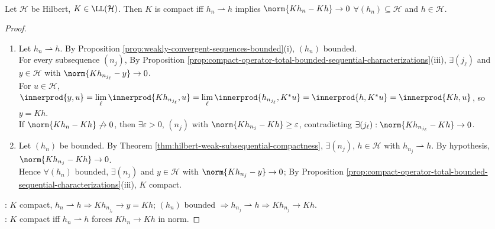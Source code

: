 \begin{theorem} \label{thm:compact-operator-weak-to-strong-characterization} \\
Let $\mathcal{H}$ be Hilbert, $K\in\LL(\mathcal{H})$. Then $K$ is compact iff $h_n\rightharpoonup h$ implies $\norm{Kh_n-Kh}\to0$ $\forall (h_n)\subseteq\mathcal{H}$ and $h\in\mathcal{H}$.
\begin{proof}
\begin{enumerate}[label=\roman*.]
\setlength{\itemsep}{0pt}
\item[$(\Rightarrow)$] Let $h_n\rightharpoonup h$. By Proposition \ref{prop:weakly-convergent-sequences-bounded}(i), $(h_n)$ bounded.\\
For every subsequence $(n_j)$, By Proposition \ref{prop:compact-operator-total-bounded-sequential-characterizations}(iii), $\exists(j_\ell)$ and $y\in\mathcal{H}$ with $\norm{Kh_{n_{j_\ell}}-y}\to0$.\\
For $u\in\mathcal{H}$, $\innerprod{y,u}=\lim\limits_{\ell}\innerprod{Kh_{n_{j_\ell}},u}=\lim\limits_{\ell}\innerprod{h_{n_{j_\ell}},K^*u}=\innerprod{h,K^*u}=\innerprod{Kh,u}$, so $y=Kh$.\\
If $\norm{Kh_n-Kh}\not\to0$, then $\exists\varepsilon>0$, $(n_j)$ with $\norm{Kh_{n_j}-Kh}\geq\varepsilon$, contradicting $\exists(j_\ell):\norm{Kh_{n_{j_\ell}}-Kh}\to0$.
\item[$(\Leftarrow)$] Let $(h_n)$ be bounded. By Theorem \ref{thm:hilbert-weak-subsequential-compactness}, $\exists(n_j)$, $h\in\mathcal{H}$ with $h_{n_j}\rightharpoonup h$. By hypothesis, $\norm{Kh_{n_j}-Kh}\to0$.\\
Hence $\forall(h_n)$ bounded, $\exists(n_j)$ and $y\in\mathcal{H}$ with $\norm{Kh_{n_j}-y}\to0$; By Proposition \ref{prop:compact-operator-total-bounded-sequential-characterizations}(iii), $K$ compact.
\end{enumerate}
: $K$ compact, $h_n\rightharpoonup h\Rightarrow Kh_{n_{j_\ell}}\to y=Kh$; $(h_n)$ bounded $\Rightarrow h_{n_j}\rightharpoonup h\Rightarrow Kh_{n_j}\to Kh$.\\
: $K$ compact iff $h_n\rightharpoonup h$ forces $Kh_n\to Kh$ in norm.
\end{proof}
\end{theorem}

